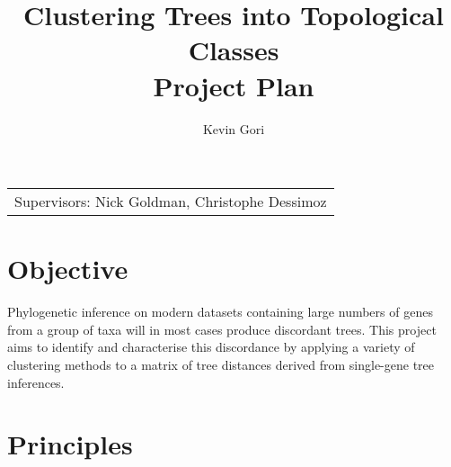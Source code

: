 \documentclass[11pt]{article}
\title{\textbf{Clustering Trees into Topological Classes \\ Project Plan}} %
\author{Kevin Gori} %
\begin{document}
\maketitle %

\begin{tabular}{l}
Supervisors: Nick Goldman, Christophe Dessimoz %
\end{tabular}

\setlength\parindent{0pt} %



\section{Objective}
Phylogenetic inference on modern datasets containing large numbers of 
genes from a group of taxa will in most cases produce discordant trees. 
This project aims to identify and characterise this discordance by applying 
a variety of clustering methods to a matrix of tree distances derived from 
single-gene tree inferences.


\section{Principles}
\end{document}
